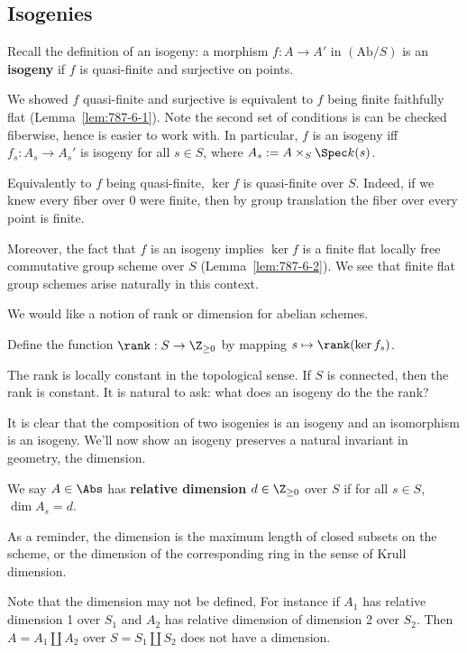 

\subsection{Isogenies}
Recall the definition of an isogeny: a morphism $f:A\to A'$ in $(\text{Ab}/S)$ is an \textbf{isogeny} if $f$ is quasi-finite and surjective on points.

We showed $f$ quasi-finite and surjective is equivalent to $f$ being finite faithfully flat (Lemma~\ref{lem:787-6-1}). Note the second set of conditions is can be checked fiberwise, hence is easier to work with. In particular, $f$ is an isogeny iff $f_s:A_s\to A_s'$ is isogeny for all $s\in S$, where $A_s:=A\times_S \Spec k(s)$. 

Equivalently to $f$ being quasi-finite, $\ker f$ is quasi-finite over $S$. %
Indeed, if we knew every fiber over 0 were finite, then by group translation the fiber over every point is finite.

Moreover, the fact that $f$ is an isogeny implies $\ker f$ is a finite flat locally free commutative group scheme over $S$ (Lemma~\ref{lem:787-6-2}). We see that finite flat group schemes arise naturally in this context.

We would like a notion of rank or dimension for abelian schemes.
\begin{df}
Define the function $\rank:S\to \Z_{\ge 0}$ by mapping $s\mapsto \rank(\ker f_s)$.
\end{df}
The rank is locally constant in the topological sense. If $S$ is connected, then the rank is constant.
It is natural to ask: what does an isogeny do the the rank?

It is clear that the composition of two isogenies is an isogeny and an isomorphism is an isogeny. We'll now show an isogeny preserves a natural invariant in geometry, the dimension.

\begin{df}
We say $A\in \Abs$ has \textbf{relative dimension} $d\in \Z_{\ge 0}$ over $S$ if for all $s\in S$, $\dim A_s=d$. 
\end{df}
As a reminder, the dimension is the maximum length of closed subsets on the scheme, or the dimension of the corresponding ring in the sense of Krull dimension.

Note that the dimension may not be defined, For instance if $A_1$ has relative dimension 1 over $S_1$ and $A_2$ has relative dimension of dimension 2 over $S_2$. Then $A=A_1\coprod A_2$ over $S=S_1\coprod S_2$ does not have a dimension.

